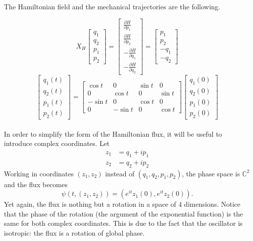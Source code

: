 \documentclass[12pt]{article}
\theoremstyle{plain}
\begin{document}
The Hamiltonian field and the mechanical trajectories are the following.

$$X_H \begin{bmatrix}
    q_1\\
    q_2\\
    p_1\\
    p_2
\end{bmatrix} = \begin{bmatrix}
    \frac{\partial H}{\partial p_1}\\
    \frac{\partial H}{\partial p_2}\\
    -\frac{\partial H}{\partial q_1}\\
    -\frac{\partial H}{\partial q_2}
\end{bmatrix} = \begin{bmatrix}
    p_1\\
    p_2\\
    -q_1\\
    -q_2
\end{bmatrix}$$
$$\begin{bmatrix}
    q_1(t)\\
    q_2(t)\\
    p_1(t)\\
    p_2(t)
\end{bmatrix} = \begin{bmatrix}
    \cos t & 0 &\sin t & 0\\
    0 & \cos t & 0 &\sin t\\
    -\sin t & 0 & \cos t &0\\
    0 &-\sin t & 0 & \cos t
\end{bmatrix}\begin{bmatrix}
    q_1(0)\\
    q_2(0)\\
    p_1(0)\\
    p_2(0)
\end{bmatrix}$$\\

In order to simplify the form of the Hamiltonian flux, it will be useful to introduce complex coordinates. Let \begin{align*}
    z_1 &= q_1 + ip_1\\
    z_2 &= q_2 + ip_2
\end{align*} Working in coordinates $(z_1,z_2)$ instead of $(q_1,q_2,p_1,p_2)$, the phase space is $\mathbb{C}^2$ and the flux becomes $$\psi(t,(z_1,z_2)) = \left(e^{it}z_1(0), e^{it}z_2(0)\right).$$
Yet again, the flux is nothing but a rotation in a space of $4$ dimensions. Notice that the phase of the rotation (the argument of the exponential function) is the same for both complex coordinates. This is due to the fact that the oscillator is isotropic: the flux is a rotation of global phase.\\
\end{document}
